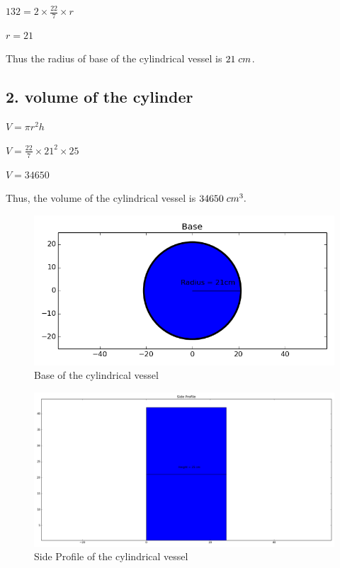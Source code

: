 \documentclass{article}
\begin{document}
$132 = 2\times\frac{22}{7}\times{r}$

\vspace{1mm}

$r = 21$

\begin{center}
    \large{Thus the radius of base of the cylindrical vessel is $21 \hspace{1mm}cm$.}
\end{center}

\vspace{2mm}

\subsection*{2. volume of the cylinder}

\vspace{2mm}

$V = \pi{r^2h}$

\vspace{1mm}

$V = \frac{22}{7}\times21^2\times25$

\vspace{1mm}

$V = 34650$

\vspace{1mm}

\begin{center}
    \large{Thus, the volume of the cylindrical vessel is $34650 \hspace{1mm} cm^3.$}
\end{center}

\clearpage

\begin{figure}[h]
    \centering
    \includegraphics[scale = 0.5]{Figures/Base.png}
    \caption{Base of the cylindrical vessel}
    \label{fig:Base}
\end{figure}

\begin{figure}
    \centering
    \includegraphics[scale = 0.5]{Figures/Side Profile.png}
    \caption{Side Profile of the cylindrical vessel}
    \label{fig:Side}
\end{figure}
\end{document}
